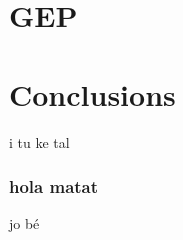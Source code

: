 \documentclass{beamer}
\begin{document}
\section{GEP} %
\label{sec:GEP}

\section{Conclusions} %
\label{sec:Conclusions}
\begin{frame}
	i tu ke tal
\end{frame}

\subsubsection{hola matat} %
\label{ssub:hola matat}
\begin{frame}
	jo bé
\end{frame}





\end{document}
